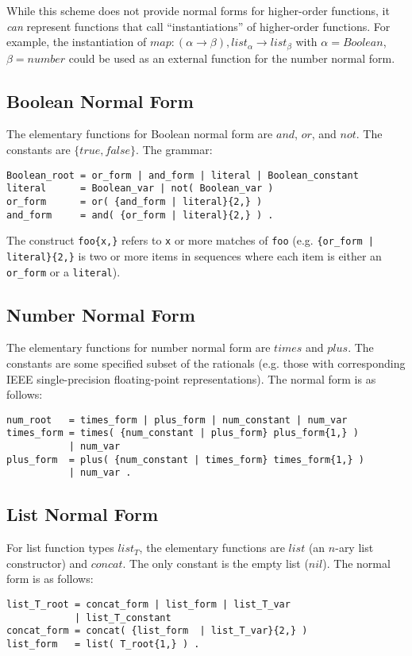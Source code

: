 \documentclass[letterpaper]{article}
\begin{document}
While this scheme does not provide normal forms for higher-order functions, it
\emph{can} represent functions that call ``instantiations'' of higher-order
functions. For example, the instantiation of $map : (\alpha \rightarrow \beta),
list_{\alpha} \rightarrow list_{\beta}$ with $\alpha = Boolean$, $\beta =
number$ could be used as an external function for the number normal form.

\subsection{Boolean Normal Form}

The elementary functions for Boolean normal form are $and$, $or$, and
$not$. The constants are $\{true, false\}$. The grammar:
\begin{verbatim}
Boolean_root = or_form | and_form | literal | Boolean_constant
literal      = Boolean_var | not( Boolean_var )
or_form      = or( {and_form | literal}{2,} )
and_form     = and( {or_form | literal}{2,} ) .
\end{verbatim}

The construct \verb|foo{x,}| refers to \verb|x| or more matches of \verb|foo|
(e.g. \verb!{or_form | literal}{2,}! is two or more items in sequences where
each item is either an \verb|or_form| or a \verb|literal|).

\subsection{Number Normal Form}

The elementary functions for number normal form are $times$ and $plus$. The
constants are some specified subset of the rationals (e.g. those with
corresponding IEEE single-precision floating-point representations). The normal
form is as follows:
\begin{verbatim}
num_root   = times_form | plus_form | num_constant | num_var
times_form = times( {num_constant | plus_form} plus_form{1,} ) 
           | num_var
plus_form  = plus( {num_constant | times_form} times_form{1,} ) 
           | num_var .
\end{verbatim}

\subsection{List Normal Form}

For list function types $list_T$, the elementary functions are $list$ (an
$n$-ary list constructor) and $concat$. The only constant is the empty list
($nil$). The normal form is as follows:
\begin{verbatim}
list_T_root = concat_form | list_form | list_T_var
            | list_T_constant
concat_form = concat( {list_form  | list_T_var}{2,} )
list_form   = list( T_root{1,} ) .
\end{verbatim}
\end{document}
